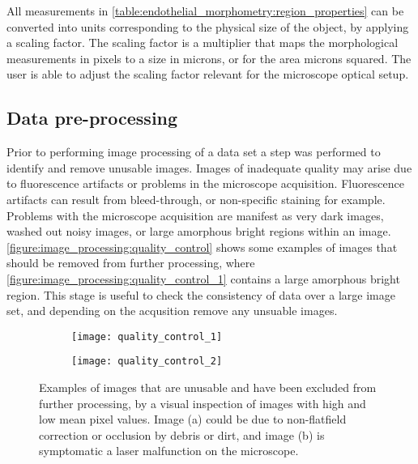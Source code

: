 All measurements in \autoref{table:endothelial_morphometry:region_properties} can be converted into units corresponding to the physical size of the object, by applying a scaling factor. The scaling factor is a multiplier that maps the morphological measurements in pixels to a size in microns, or for the area microns squared. The user is able to adjust the scaling factor relevant for the microscope optical setup.

\subsection{Data pre-processing}
\label{endothelial_morphometry:image_processing:data_preprocessing}
Prior to performing image processing of a data set a step was performed to identify and remove unusable images. Images of inadequate quality may arise due to fluorescence artifacts or problems in the microscope acquisition. Fluorescence artifacts can result from bleed-through, or non-specific staining for example. Problems with the microscope acquisition are manifest as very dark images, washed out noisy images, or large amorphous bright regions within an image. \autoref{figure:image_processing:quality_control} shows some examples of images that should be removed from further processing, where \autoref{figure:image_processing:quality_control_1} contains a large amorphous bright region. This stage is useful to check the consistency of data over a large image set, and depending on the acqusition remove any unsuable images.

\begin{figure}[htbp]\centering
	\begin{subfigure}[b]{0.49\linewidth} %
		\centering
		\texttt{[image: quality\_control\_1]}
		\caption{}
		\label{figure:image_processing:quality_control_1}
		\vspace{1ex} \end{subfigure} \begin{subfigure}[b]{0.49\linewidth} %
		\centering
		\texttt{[image: quality\_control\_2]}
		\caption{}
		\label{figure:image_processing:quality_control_2}
		\vspace{1ex}
	\end{subfigure}
\caption[Examples of images excluded from high-throughput analysis]{Examples of images that are unusable and have been excluded from further processing, by a visual inspection of images with high and low mean pixel values. Image (a) could be due to non-flatfield correction or occlusion by debris or dirt, and image (b) is symptomatic a laser malfunction on the microscope.}
\label{figure:image_processing:quality_control}
\end{figure}


